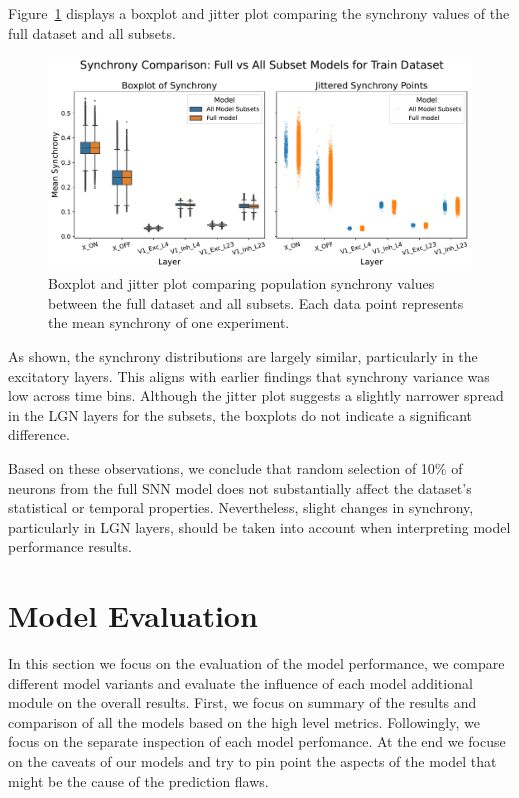 Figure~\ref{fig:boxplot_synchrony_subset} displays a boxplot and jitter plot comparing the synchrony values of the full dataset and all subsets.

\begin{figure}
    \centering
    \includegraphics[width=\linewidth]{img/plots/synchrony_comparison_subset_full_train.pdf}
    \caption{Boxplot and jitter plot comparing population synchrony values between the full dataset and all subsets. Each data point represents the mean synchrony of one experiment.}
    \label{fig:boxplot_synchrony_subset}
\end{figure}

As shown, the synchrony distributions are largely similar, particularly in the excitatory layers. This aligns with earlier findings that synchrony variance was low across time bins. Although the jitter plot suggests a slightly narrower spread in the LGN layers for the subsets, the boxplots do not indicate a significant difference.

Based on these observations, we conclude that random selection of 10\% of neurons from the full SNN model does not substantially affect the dataset's statistical or temporal properties. Nevertheless, slight changes in synchrony, particularly in LGN layers, should be taken into account when interpreting model performance results.

\section{Model Evaluation}
\label{sec:model_evaluation}
In this section we focus on the evaluation of the model performance, we compare different model variants and evaluate the influence of each model additional module on the overall results. First, we focus on summary of the results and comparison of all the models based on the high level metrics. Followingly, we focus on the separate inspection of each model perfomance. At the end we focuse on the caveats of our models and try to pin point the aspects of the model that might be the cause of the prediction flaws.

